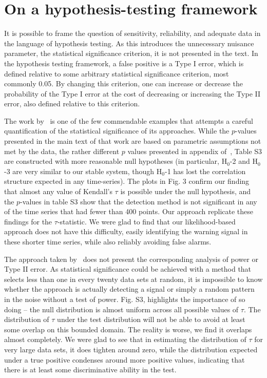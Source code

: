 \documentclass[authoryear, preprint,review,12pt]{elsarticle}
\begin{document}
\section{On a hypothesis-testing framework}
It is possible to frame the question of sensitivity, reliability, and adequate data in the language of hypothesis testing. As this introduces the unnecessary nuisance parameter, the statistical significance criterion, it is not presented in the text.  In the hypothesis testing framework, a false positive is a Type I error, which is defined relative to some arbitrary statistical significance criterion, most commonly 0.05.  By changing this criterion, one can increase or decrease the probability of the Type I error at the cost of decreasing or increasing the Type II error, also defined relative to this criterion.  

The work by~\citet{Dakos2008} is one of the few commendable examples that attempts a careful quantification of the statistical significance of its approaches.  While the $p$-values presented in the main text of that work are based on parametric assumptions not met by the data, the rather different $p$ values presented in appendix of~\citet{Dakos2008}, Table S3 are constructed with more reasonable null hypotheses (in particular, H$_0$-2 and H$_0$-3 are very similar to our stable system, though H$_0$-1 has lost the correlation structure expected in any time-series).  The plots in Fig. 3 confirm our finding that almost any value of Kendall's $\tau$ is possible under the null hypothesis, and the $p$-values in table S3 show that the detection method is not significant in any of the time series that had fewer than 400 points.  Our approach replicate these findings for the $\tau$-statistic.  We were glad to find that our likelihood-based approach does not have this difficulty, easily identifying the warning signal in these shorter time series, while also reliably avoiding false alarms.  

The approach taken by~\citet{Dakos2008} does not present the corresponding analysis of power or Type II error.  As statistical significance could be achieved with a method that selects less than one in every twenty data sets at random, it is impossible to know whether the approach is actually detecting a signal or simply a random pattern in the noise without a test of power.  Fig. S3, highlights the importance of so doing -- the null distribution is almost uniform across all possible values of $\tau$.  The distribution of $\tau$ under the test distribution will not be able to avoid at least some overlap on this bounded domain.  The reality is worse, we find it overlaps almost completely.  We were glad to see that in estimating the distribution of $\tau$ for very large data sets, it does tighten around zero, while the distribution expected under a true positive condenses around more positive values, indicating that there is at least some discriminative ability in the test. 
\end{document}
